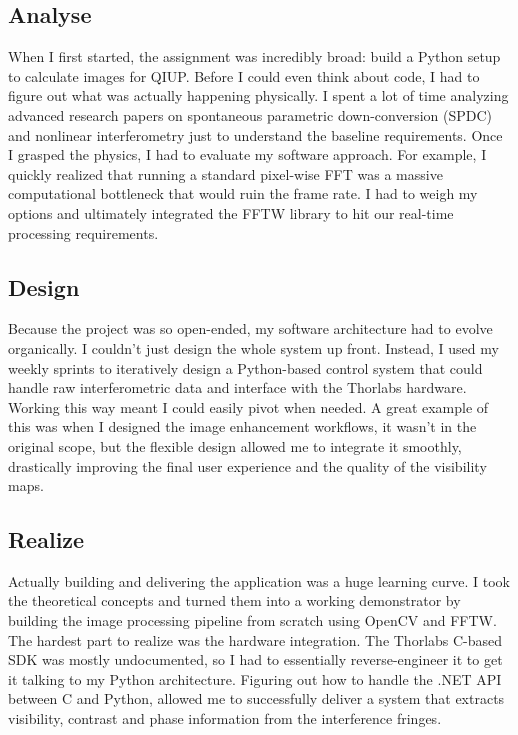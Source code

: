 \documentclass[12pt,a4paper]{article}
\begin{document}
\subsection{Analyse}
When I first started, the assignment was incredibly broad: build a Python setup to calculate images for QIUP. Before I could even think about code, I had to figure out what was actually happening physically. I spent a lot of time analyzing advanced research papers on spontaneous parametric down-conversion (SPDC) and nonlinear interferometry just to understand the baseline requirements. Once I grasped the physics, I had to evaluate my software approach. For example, I quickly realized that running a standard pixel-wise FFT was a massive computational bottleneck that would ruin the frame rate. I had to weigh my options and ultimately integrated the FFTW library to hit our real-time processing requirements.

\subsection{Design}
Because the project was so open-ended, my software architecture had to evolve organically. I couldn't just design the whole system up front. Instead, I used my weekly sprints to iteratively design a Python-based control system that could handle raw interferometric data and interface with the Thorlabs hardware. Working this way meant I could easily pivot when needed. A great example of this was when I designed the image enhancement workflows, it wasn't in the original scope, but the flexible design allowed me to integrate it smoothly, drastically improving the final user experience and the quality of the visibility maps.

\subsection{Realize}
Actually building and delivering the application was a huge learning curve. I took the theoretical concepts and turned them into a working demonstrator by building the image processing pipeline from scratch using OpenCV and FFTW. The hardest part to realize was the hardware integration. The Thorlabs C-based SDK was mostly undocumented, so I had to essentially reverse-engineer it to get it talking to my Python architecture. Figuring out how to handle the .NET API between C and Python, allowed me to successfully deliver a system that extracts visibility, contrast and phase information from the interference fringes.
\end{document}
